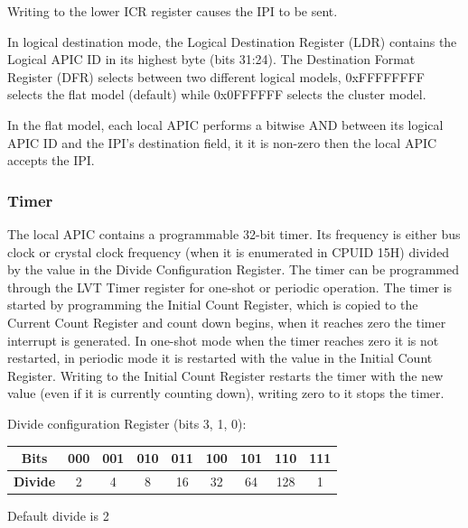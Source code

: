 \documentclass{article}
\newcommand{\layout}[1]{\parbox{\linewidth}{#1}}
\begin{document}
\layout{
  Writing to the lower ICR register causes the IPI to be sent.

  \bigskip \cite[Chapter~12.6.1]{sdm3}
} \bigskip

\layout{
  In logical destination mode, the Logical Destination Register (LDR) contains the Logical APIC ID in its highest byte (bits 31:24).
  The Destination Format Register (DFR) selects between two different logical models, 0xFFFFFFFF selects the flat model (default) while 0x0FFFFFF selects the cluster model.

  In the flat model, each local APIC performs a bitwise AND between its logical APIC ID and the IPI's destination field, it it is non-zero then the local APIC accepts the IPI.


  \bigskip \cite[12.6.2.2]{sdm3}
}

\layout{
  \subsubsection{Timer}

  The local APIC contains a programmable 32-bit timer.
  Its frequency is either bus clock or crystal clock frequency (when it is enumerated in CPUID 15H) divided by the value in the Divide Configuration Register.
  The timer can be programmed through the LVT Timer register for one-shot or periodic operation.
  The timer is started by programming the Initial Count Register, which is copied to the Current Count Register and count down begins, when it reaches zero the timer interrupt is generated.
  In one-shot mode when the timer reaches zero it is not restarted, in periodic mode it is restarted with the value in the Initial Count Register.
  Writing to the Initial Count Register restarts the timer with the new value (even if it is currently counting down), writing zero to it stops the timer.
} \bigskip

\layout{
  Divide configuration Register (bits 3, 1, 0):
  \begin{table}[H]
    \centering
    \begin{tabular}{|c|c|c|c|c|c|c|c|c|}
      \hline \textbf{Bits} & 000 & 001 & 010 & 011 & 100 & 101 & 110 & 111 \\ \hline
      \textbf{Divide} & 2 & 4 & 8 & 16 & 32 & 64 & 128 & 1 \\ \hline
    \end{tabular}
  \end{table}

  Default divide is 2

  \bigskip \cite[Chapter~13.5.4]{sdm3}
}
\end{document}
